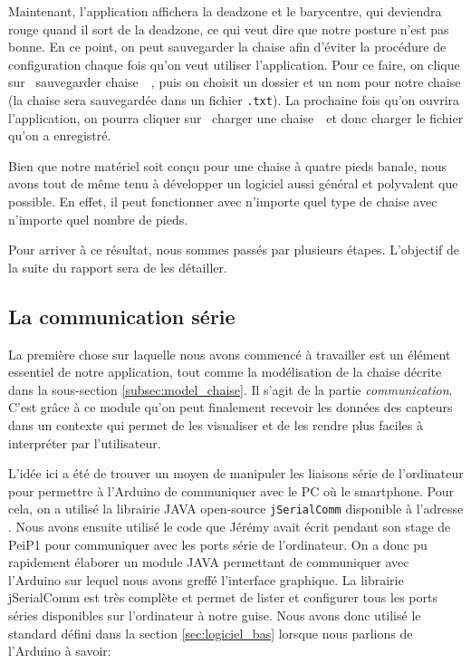 \documentclass{polytech/polytech}
\begin{document}
Maintenant, l'application affichera la deadzone et le barycentre, qui deviendra rouge quand il sort de la deadzone, ce qui veut dire que notre posture n'est pas bonne.
 En ce point, on peut sauvegarder la chaise afin d'éviter la procédure de configuration chaque fois qu'on veut utiliser l'application. 
Pour ce faire, on clique sur \guillemotleft ~sauvegarder chaise~\guillemotright\ , puis on choisit un dossier et un nom pour notre chaise (la chaise sera sauvegardée dans un fichier \texttt{.txt}). 
La prochaine fois qu'on ouvrira l'application, on pourra cliquer sur \guillemotleft ~charger une chaise~\guillemotright\  et donc charger le fichier qu'on a enregistré.

Bien que notre matériel soit conçu pour une chaise à quatre pieds banale, nous avons tout de même tenu à développer un logiciel aussi général et polyvalent que possible.
En effet, il peut fonctionner avec n'importe quel type de chaise avec n'importe quel nombre de pieds.

Pour arriver à ce résultat, nous sommes passés par plusieurs étapes. L'objectif de la suite du rapport sera de les détailler.

\subsection{La communication série}
La première chose sur laquelle nous avons commencé à travailler est un élément essentiel de notre application, tout comme la modélisation de la chaise décrite dans la sous-section \ref{subsec:model_chaise}. Il s'agit de la partie \textit{communication}. C'est grâce à ce module qu'on peut finalement recevoir les données des capteurs dans un contexte qui permet de les visualiser et de les rendre plus faciles à interpréter par l'utilisateur.

L'idée ici a été de trouver un moyen de manipuler les liaisons série de l'ordinateur pour permettre à l'Arduino de communiquer avec le PC où le smartphone.
Pour cela, on a utilisé la librairie JAVA open-source \texttt{jSerialComm} disponible à l'adresse \cite{jserialcomm}. Nous avons ensuite utilisé le code que Jérémy avait écrit pendant son stage de PeiP1 pour communiquer avec les ports série de l'ordinateur. On a donc pu rapidement élaborer un module JAVA permettant de communiquer avec l'Arduino sur lequel nous avons greffé l'interface graphique. La librairie jSerialComm est très complète et permet de lister et configurer tous les ports séries disponibles sur l'ordinateur à notre guise. Nous avons donc utilisé le standard défini dans la section \ref{sec:logiciel_bas} lorsque nous parlions de l'Arduino à savoir:
\end{document}

